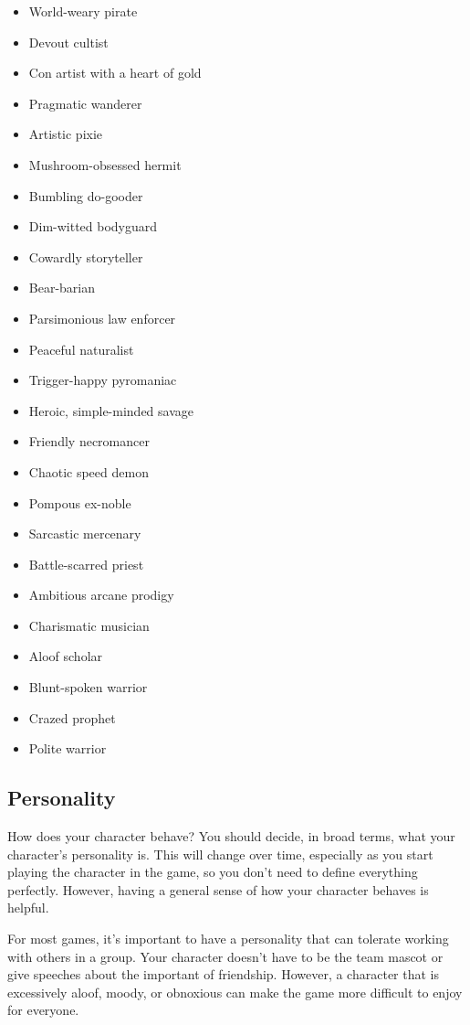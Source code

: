 \begin{itemize}
    \item World-weary pirate
    \item Devout cultist
    \item Con artist with a heart of gold
    \item Pragmatic wanderer
    \item Artistic pixie
    \item Mushroom-obsessed hermit
    \item Bumbling do-gooder
    \item Dim-witted bodyguard
    \item Cowardly storyteller
    \item Bear-barian
    \item Parsimonious law enforcer
    \item Peaceful naturalist
    \item Trigger-happy pyromaniac
    \item Heroic, simple-minded savage
    \item Friendly necromancer
    \item Chaotic speed demon
    \item Pompous ex-noble
    \item Sarcastic mercenary
    \item Battle-scarred priest
    \item Ambitious arcane prodigy
    \item Charismatic musician
    \item Aloof scholar
    \item Blunt-spoken warrior
    \item Crazed prophet
    \item Polite warrior
\end{itemize}

\subsection{Personality}

How does your character behave?
You should decide, in broad terms, what your character's personality is.
This will change over time, especially as you start playing the character in the game, so you don't need to define everything perfectly.
However, having a general sense of how your character behaves is helpful.

For most games, it's important to have a personality that can tolerate working with others in a group.
Your character doesn't have to be the team mascot or give speeches about the important of friendship.
However, a character that is excessively aloof, moody, or obnoxious can make the game more difficult to enjoy for everyone.

